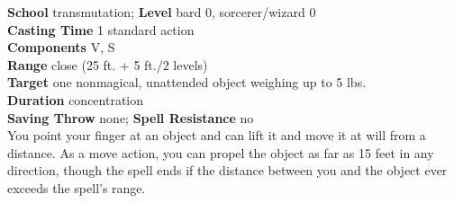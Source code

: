 \textbf{School} transmutation; \textbf{Level} bard 0, sorcerer/wizard 0\\
\textbf{Casting Time} 1 standard action\\
\textbf{Components} V, S\\
\textbf{Range} close (25 ft. + 5 ft./2 levels)\\
\textbf{Target} one nonmagical, unattended object weighing up to 5 lbs.\\
\textbf{Duration} concentration\\
\textbf{Saving Throw} none; \textbf{Spell Resistance} no\\
You point your finger at an object and can lift it and move it at will from a distance. As a move action, you can propel the object as far as 15 feet in any direction, though the spell ends if the distance between you and the object ever exceeds the spell's range.\\
